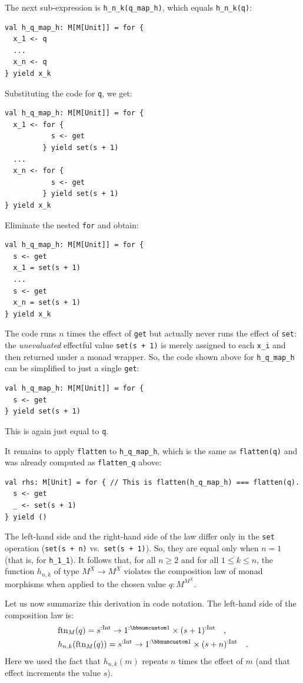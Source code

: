 The next sub-expression is \lstinline!h_n_k(q_map_h)!, which equals
\lstinline!h_n_k(q)!:
\begin{lstlisting}
val h_q_map_h: M[M[Unit]] = for {
  x_1 <- q
  ...
  x_n <- q
} yield x_k
\end{lstlisting}
Substituting the code for \lstinline!q!, we get:
\begin{lstlisting}
val h_q_map_h: M[M[Unit]] = for {
  x_1 <- for {
           s <- get
         } yield set(s + 1)
  ...
  x_n <- for {
           s <- get
         } yield set(s + 1)
} yield x_k
\end{lstlisting}
Eliminate the nested \lstinline!for! and obtain:
\begin{lstlisting}
val h_q_map_h: M[M[Unit]] = for {
  s <- get
  x_1 = set(s + 1)
  ...
  s <- get
  x_n = set(s + 1)
} yield x_k
\end{lstlisting}
The code runs $n$ times the effect of \lstinline!get! but actually
never runs the effect of \lstinline!set!: the \emph{unevaluated}
effectful value \lstinline!set(s + 1)! is merely assigned to each
\lstinline!x_i! and then returned under a monad wrapper. So, the
code shown above for \lstinline!h_q_map_h! can be simplified to just
a single \lstinline!get!:
\begin{lstlisting}
val h_q_map_h: M[M[Unit]] = for {
  s <- get
} yield set(s + 1)
\end{lstlisting}
This is again just equal to \lstinline!q!.

It remains to apply \lstinline!flatten! to \lstinline!h_q_map_h!,
which is the same as \lstinline!flatten(q)! and was already computed
as \lstinline!flatten_q! above:
\begin{lstlisting}
val rhs: M[Unit] = for { // This is flatten(h_q_map_h) === flatten(q).
  s <- get
  _ <- set(s + 1)
} yield ()
\end{lstlisting}

The left-hand side and the right-hand side of the law differ only
in the \lstinline!set! operation (\lstinline!set(s + n)! vs.~\lstinline!set(s + 1)!).
So, they are equal only when $n=1$ (that is, for \lstinline!h_1_1!).
It follows that, for all $n\ge2$ and for all $1\le k\le n$, the
function $h_{n,k}$ of type $M^{X}\rightarrow M^{X}$ violates the
composition law of monad morphisms when applied to the chosen value
$q:M^{M^{X}}$.

Let us now summarize this derivation in code notation. The left-hand
side of the composition law is: 
\begin{align*}
 & \text{ftn}_{M}(q)=s^{:\text{Int}}\rightarrow1^{:\bbnum 1}\times(s+1)^{:\text{Int}}\quad,\\
 & h_{n,k}(\text{ftn}_{M}(q))=s^{:\text{Int}}\rightarrow1^{:\bbnum 1}\times(s+n)^{:\text{Int}}\quad.
\end{align*}
Here we used the fact that $h_{n,k}(m)$ repeats $n$ times the effect
of $m$ (and that effect increments the value $s$). 

